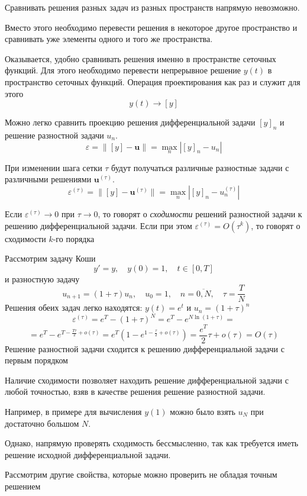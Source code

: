 \documentclass[professionalfonts,compress,unicode]{beamer}
\begin{document}
{
	Сравнивать решения разных задач из разных пространств напрямую невозможно. 
	
	Вместо этого необходимо перевести решения в некоторое другое пространство и сравнивать уже элементы 
	одного и того же пространства.
	\pause
	
	Оказывается, удобно сравнивать решения именно в пространстве сеточных функций. Для этого необходимо перевести 
	непрерывное решение $y(t)$ в пространство сеточных функций. Операция проектирования как раз и служит для этого
	$$
	y(t) \rightarrow [y]
	$$
}

{
	Можно легко сравнить проекцию решения дифференциальной задачи $[y]_n$ и решение разностной задачи $u_n$. 
	$$
	\varepsilon = \|[y] - \mathbf{u}\| = \max_n |[y]_n - u_n|
	$$
	
	При изменении шага сетки $\tau$ будут получаться различные разностные задачи 
	с различными решениями $\mathbf{u}^{(\tau)}$. 
	$$
	\varepsilon^{(\tau)} = \|[y] - \mathbf{u}^{(\tau)}\| = \max_n |[y]_n - u_n^{(\tau)}|
	$$
	
	Если $\varepsilon^{(\tau)} \rightarrow 0$ при $\tau \rightarrow 0$, то говорят о \emph{сходимости} решений 
	разностной задачи к решению дифференциальной задачи. Если при этом $\varepsilon^{(\tau)} = O(\tau^k)$, 
	то говорят о сходимости $k$-го порядка
}

{
	Рассмотрим задачу Коши
	$$
		y' = y, \quad y(0) = 1, \quad t \in [0, T]
	$$
	и разностную задачу
	$$
		u_{n+1} = (1 + \tau) u_n, \quad u_0 = 1, \quad n = \overline{0,N}, \quad \tau = \frac{T}{N}
	$$
	Решения обеих задач легко находятся: $y(t) = e^t$ и $u_n = \left(1+\tau\right)^n$
	$$
	\varepsilon^{(\tau)} = e^T - \left(1 + \tau\right)^N = e^T - e^{N \ln \left(1+\tau\right)} = 
	$$
	$$
	= e^T - e^{T - \frac{T\tau}{2} + o\left(\tau\right)} = e^T \left(1 - e^{1-\frac{\tau}{2}+o(\tau)} \right) = 
	\frac{e^T}{2}\tau + o(\tau) = O(\tau)
	$$
	Решение разностной задачи сходится к решению дифференциальной задачи с первым порядком
}

{
	Наличие сходимости позволяет находить решение дифференциальной задачи с любой точностью, взяв 
	в качестве решения решение разностной задачи. 
	
	Например, в примере для вычисления $y(1)$ можно было взять $u_N$ при достаточно большом $N$.
	\pause
	
	Однако, напрямую проверять сходимость бессмысленно, так как требуется иметь решение исходной 
	дифференциальной задачи.
	
	Рассмотрим другие свойства, которые можно проверить не обладая точным решением
}
\end{document}
